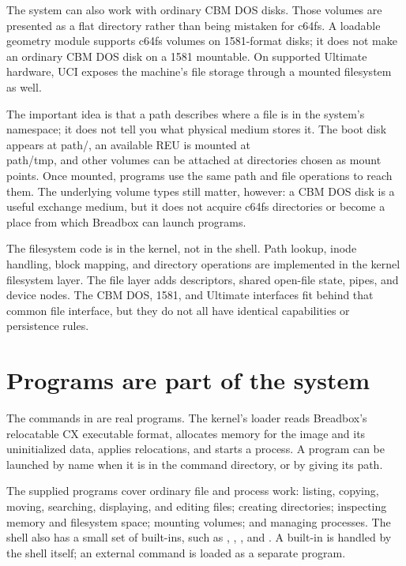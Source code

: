 The system can also work with ordinary CBM DOS disks. Those volumes are presented as a flat directory rather than being mistaken for c64fs. A loadable geometry module supports c64fs volumes on 1581-format disks; it does not make an ordinary CBM DOS disk on a 1581 mountable. On supported Ultimate hardware, UCI exposes the machine's file storage through a mounted filesystem as well.

The important idea is that a path describes where a file is in the system's namespace; it does not tell you what physical medium stores it. The boot disk appears at path{/}, an available REU is mounted at \\path{/tmp}, and other volumes can be attached at directories chosen as mount points. Once mounted, programs use the same path and file operations to reach them. The underlying volume types still matter, however: a CBM DOS disk is a useful exchange medium, but it does not acquire c64fs directories or become a place from which Breadbox can launch programs.

\begin{underhood}
The filesystem code is in the kernel, not in the shell. Path lookup, inode handling, block mapping, and directory operations are implemented in the kernel filesystem layer. The file layer adds descriptors, shared open-file state, pipes, and device nodes. The CBM DOS, 1581, and Ultimate interfaces fit behind that common file interface, but they do not all have identical capabilities or persistence rules.
\end{underhood}

\section{Programs are part of the system}

The commands in  are real programs. The kernel's loader reads Breadbox's relocatable CX executable format, allocates memory for the image and its uninitialized data, applies relocations, and starts a process. A program can be launched by name when it is in the command directory, or by giving its path.

The supplied programs cover ordinary file and process work: listing, copying, moving, searching, displaying, and editing files; creating directories; inspecting memory and filesystem space; mounting volumes; and managing processes. The shell also has a small set of built-ins, such as , , , and . A built-in is handled by the shell itself; an external command is loaded as a separate program.

